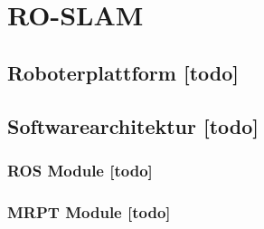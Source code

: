\begin{comment}
------------------------------------------------------------------------------------------
- \cite{kurth2003experimental}
	- Numerically, we can evaluate the performance of the dead reckoning and Kalman lter localization methods by considering the cross-track error (XTE). That is, for each pose we measure how far left or right of the true position our estimation is, orthogonal to the true heading. We compile these errors for every point along the path, then nd the maximum value along with the mean and standard deviation of the errors to produce the evaluative statistics in Table 1.
	- https://de.wikipedia.org/wiki/Querabweichung
- Diagramme
	- \cite{kurth2003experimental}
		- Fig. 5: (1) The ground truth path with tags indicated by circles. The numbers indicate how many range measurements were received from each tag over the duration of Test 1. (2) The path estimate from dead reckoning alone. (3) The path estimate from localization using a Kalman lter. The lter fuses data from odometry and a gyro with absolute measurements from RF tags to produce this path estimate. Numerical results are given in Table 1. (X: position in x(m), Y: position in y(m), Ground truth path with tag locations, Dead reckoning path, Kalman filter localization path)
\end{comment}
\chapter{RO-SLAM}\label{ch:ro_slam}


\begin{comment}
------------------------------------------------------------------------------------------
\end{comment}
\section{Roboterplattform [todo]}


\begin{comment}
------------------------------------------------------------------------------------------
\end{comment}
\section{Softwarearchitektur [todo]}


\begin{comment}
------------------------------------------------------------------------------------------
\end{comment}
\subsection{ROS Module [todo]}


\begin{comment}
------------------------------------------------------------------------------------------
\end{comment}
\subsection{MRPT Module [todo]}